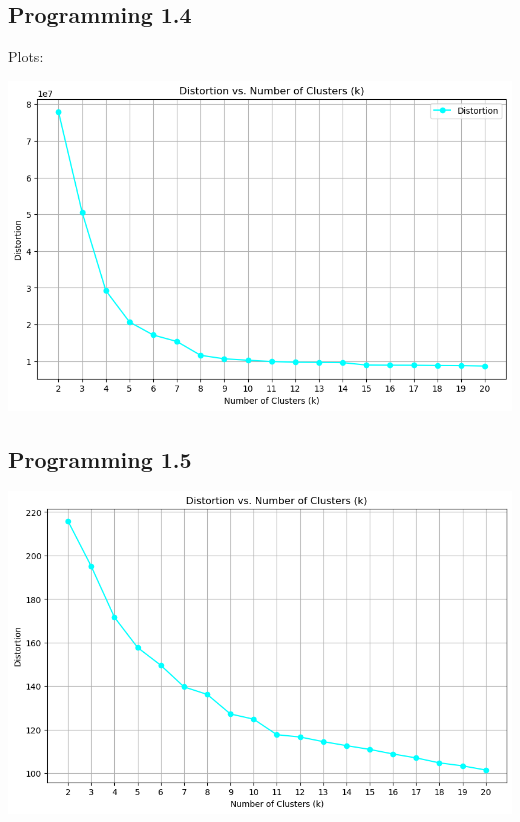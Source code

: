 \documentclass[12pt]{article}
\begin{document}
\subsection{Programming 1.4}
Plots: \\
\begin{center}
  \includegraphics[scale=0.5]{dist_vs_nCluster_01.png}
\end{center}
\subsection{Programming 1.5}
\begin{center}
  \includegraphics[scale=0.5]{dist_vs_nCluster_02.png}
\end{center}
\end{document}
